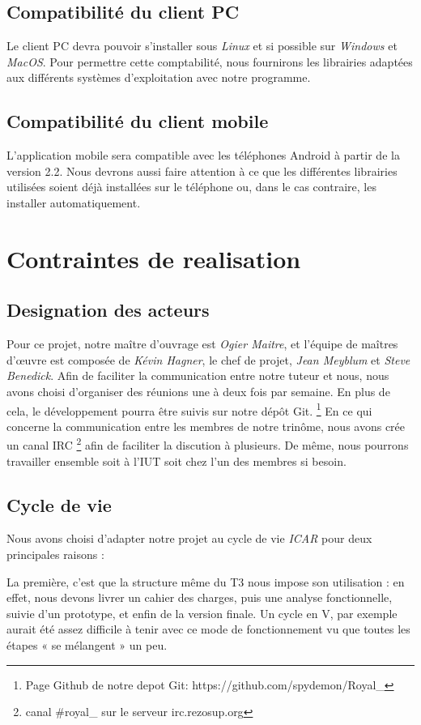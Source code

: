 \subsection{Compatibilité du client PC}
Le client PC devra pouvoir s'installer sous \emph{Linux} et si possible sur \emph{Windows} et \emph{MacOS}. 
Pour permettre cette comptabilité, nous fournirons les librairies adaptées aux différents systèmes d'exploitation avec notre programme. 

\subsection{Compatibilité du client mobile}
L'application mobile sera compatible avec les téléphones Android à partir de la version 2.2. 
Nous devrons aussi faire attention à ce que les différentes librairies utilisées soient déjà installées sur le téléphone ou, dans le cas contraire, les installer automatiquement.

\section{Contraintes de realisation}

\subsection{Designation des acteurs}
Pour ce projet, notre maître d'ouvrage est \emph{Ogier Maitre}, et l'équipe de maîtres d'œuvre est composée de \emph{Kévin Hagner}, le chef de projet, \emph{Jean Meyblum} et \emph{Steve Benedick}.
Afin de faciliter la communication entre notre tuteur et nous, nous avons choisi d'organiser des réunions une à deux fois par semaine. 
En plus de cela, le développement pourra être suivis sur notre dépôt Git.
\footnote{Page Github de notre depot Git: https://github.com/spydemon/Royal\_} 
En ce qui concerne la communication entre les membres de notre trinôme, nous avons crée un canal IRC \footnote{ canal \#royal\_ sur le serveur irc.rezosup.org} afin de faciliter la discution à plusieurs. 
De même, nous pourrons travailler ensemble soit à l'IUT soit chez l'un des membres si besoin.

\subsection{Cycle de vie}
Nous avons choisi d'adapter notre projet au cycle de vie \emph{ICAR} pour deux principales raisons : 

La première, c'est que la structure même du T3 nous impose son utilisation :
en effet, nous devons livrer un cahier des charges, puis une analyse fonctionnelle, suivie d'un prototype, et enfin de la version finale. 
Un cycle en V, par exemple aurait été assez difficile à tenir avec ce mode de fonctionnement vu que toutes les étapes « se mélangent » un peu. 

